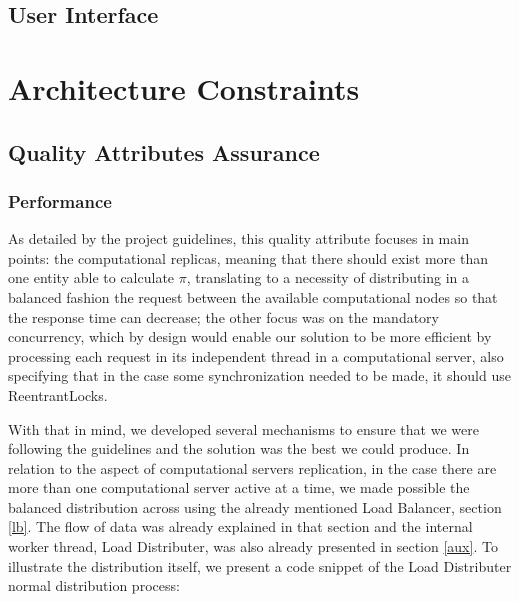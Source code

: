 \documentclass[12pt]{article}
\begin{document}
\subsection{User Interface} \label{ui} %


\newpage
\section{Architecture Constraints} \label{constraints} %


\subsection{Quality Attributes Assurance} \label{qaa} %

\subsubsection{Performance} \label{performance}
As detailed by the project guidelines, this quality attribute focuses in main points: the computational replicas, meaning that there should exist more than one entity able to calculate $\pi$, translating to a necessity of distributing in a balanced fashion the request between the available computational nodes so that the response time can decrease; the other focus was on the mandatory concurrency,  which by design would enable our solution to be more efficient by processing each request in its independent thread in a computational server, also specifying that in the case some synchronization needed to be made, it should use ReentrantLocks.

With that in mind, we developed several mechanisms to ensure that we were following the guidelines and the solution was the best we could produce. In relation to the aspect of computational servers replication, in the case there are more than one computational server active at a time, we made possible the balanced distribution across using the already mentioned Load Balancer, section \ref{lb}. The flow of data was already explained in that section and the internal worker thread, Load Distributer, was also already presented in section \ref{aux}. To illustrate the distribution itself, we present a code snippet of the Load Distributer normal distribution process:
\end{document}
